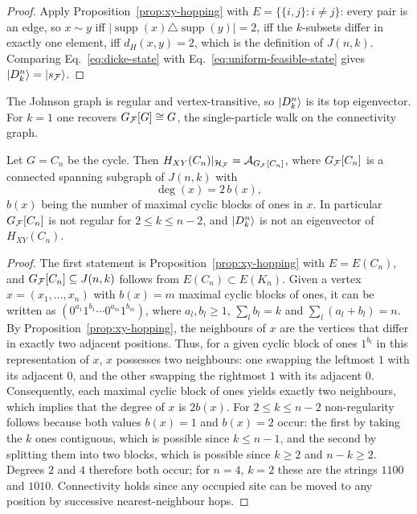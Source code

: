 \begin{proof}
Apply Proposition~\ref{prop:xy-hopping} with $E=\{\{i,j\}:i\neq j\}$: every
pair is an edge, so $x\sim y$ iff
$|\operatorname{supp}(x)\triangle\operatorname{supp}(y)|=2$, iff the
$k$-subsets differ in exactly one element, iff $d_H(x,y)=2$, which is the
definition of $J(n,k)$. Comparing Eq.~\eqref{eq:dicke-state} with
Eq.~\eqref{eq:uniform-feasible-state} gives $\ket{D^n_k}=\ket{s_{\mathcal{F}}}$.
\end{proof}

\begin{remark} The Johnson graph is regular and vertex-transitive, so
$\ket{D^n_k}$ is its top eigenvector. For $k=1$ one recovers
$G_{\mathcal{F}}[G]\cong G$, the single-particle walk on the connectivity graph.
\end{remark}

\begin{corollary}
\label{cor:ring-xy}
Let $G=C_n$ be the cycle. Then
$H_{XY}(C_n)|_{\mathcal{H}_{\mathcal{F}}}=\mathcal{A}_{G_{\mathcal{F}}[C_n]}$, where
$G_{\mathcal{F}}[C_n]$ is a connected spanning subgraph of $J(n,k)$ with
\begin{equation}
    \deg(x)=2\,b(x),
    \label{eq:ring-degree}
\end{equation}
$b(x)$ being the number of maximal cyclic blocks of ones in $x$. In
particular $G_{\mathcal{F}}[C_n]$ is not regular for $2\le k\le n-2$, and
$\ket{D^n_k}$ is not an eigenvector of $H_{XY}(C_n)$.
\end{corollary}

\begin{proof}
The first statement is Proposition~\ref{prop:xy-hopping} with $E=E(C_n)$, and
$G_{\mathcal{F}}[C_n]\subseteq J(n,k)$ follows from $E(C_n)\subset E(K_n)$. Given a
vertex $x=(x_1,\dots,x_n)$ with $b(x)=m$ maximal cyclic blocks of ones, it can
be written as $(0^{a_1}1^{b_1}\cdots 0^{a_m}1^{b_m})$, where $a_l,b_l\ge1$,
$\sum_l b_l=k$ and $\sum_l(a_l+b_l)=n$. By
Proposition~\ref{prop:xy-hopping}, the neighbours of $x$ are the vertices that
differ in exactly two adjacent positions. Thus, for a given cyclic block of
ones $1^{b_l}$ in this representation of $x$, $x$ possesses two
neighbours: one swapping the leftmost $1$ with its adjacent $0$, and the other
swapping the rightmost $1$ with its adjacent $0$. Consequently, each maximal
cyclic block of ones yields exactly two neighbours, which implies that the
degree of $x$ is $2b(x)$.
For $2\le k\le n-2$ non-regularity follows because both values $b(x)=1$ and
$b(x)=2$ occur: the first by taking the $k$ ones contiguous, which is possible
since $k\le n-1$, and the second by splitting them into two blocks, which is
possible since $k\ge2$ and $n-k\ge2$. Degrees $2$ and $4$ therefore both
occur; for $n=4$, $k=2$ these are the strings $1100$ and $1010$.
Connectivity holds since any occupied site can be moved to any position by
successive nearest-neighbour hops.
\end{proof}

